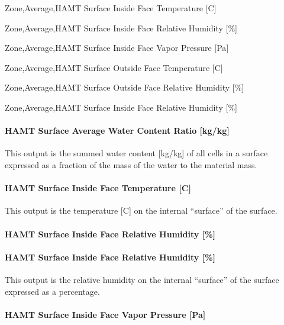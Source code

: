 Zone,Average,HAMT Surface Inside Face Temperature {[}C{]}

Zone,Average,HAMT Surface Inside Face Relative Humidity {[}\%{]}

Zone,Average,HAMT Surface Inside Face Vapor Pressure {[}Pa{]}

Zone,Average,HAMT Surface Outside Face Temperature {[}C{]}

Zone,Average,HAMT Surface Outside Face Relative Humidity {[}\%{]}

Zone,Average,HAMT Surface Inside Face Relative Humidity {[}\%{]}

\paragraph{HAMT Surface Average Water Content Ratio {[}kg/kg{]}}\label{hamt-surface-average-water-content-ratio-kgkg-2}

This output is the summed water content {[}kg/kg{]} of all cells in a surface expressed as a fraction of the mass of the water to the material mass.

\paragraph{HAMT Surface Inside Face Temperature {[}C{]}}\label{hamt-surface-inside-face-temperature-c-2}

This output is the temperature {[}C{]} on the internal ``surface'' of the surface.

\paragraph{HAMT Surface Inside Face Relative Humidity {[}\%{]}}\label{hamt-surface-inside-face-relative-humidity-4}

\paragraph{HAMT Surface Inside Face Relative Humidity {[}\%{]}}\label{hamt-surface-inside-face-relative-humidity-5}

This output is the relative humidity on the internal ``surface'' of the surface expressed as a percentage.

\paragraph{HAMT Surface Inside Face Vapor Pressure {[}Pa{]}}\label{hamt-surface-inside-face-vapor-pressure-pa-2}

